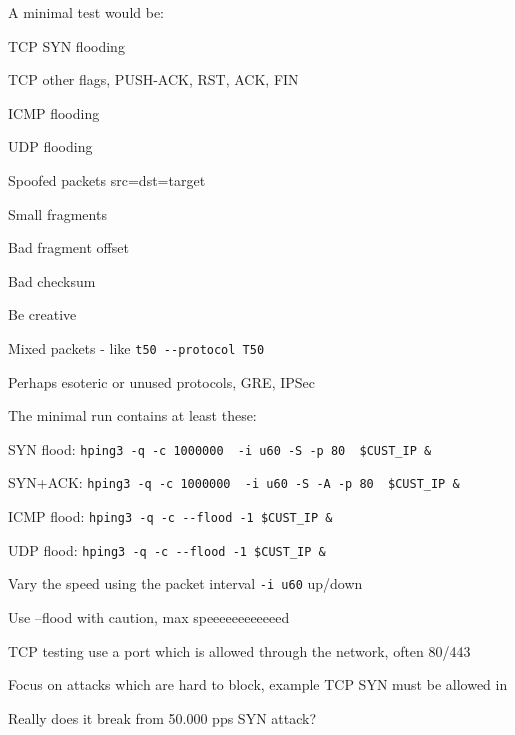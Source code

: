\documentclass[20pt,landscape,a4paper,footrule]{foils}
\begin{document}
A minimal test would be:
\begin{list2}
\item TCP SYN flooding
\item TCP other flags, PUSH-ACK, RST, ACK, FIN
\item ICMP flooding
\item UDP flooding
\item Spoofed packets src=dst=target \smiley
\item Small fragments
\item Bad fragment offset
\item Bad checksum
\item Be creative
\item Mixed packets - like \verb+t50 --protocol T50+
\item Perhaps esoteric or unused protocols, GRE, IPSec
\end{list2}


\begin{list1}
\item The minimal run contains at least these:
\begin{list2}
\item SYN flood: \verb+hping3 -q -c 1000000  -i u60 -S -p 80  $CUST_IP &+
\item SYN+ACK: \verb+hping3 -q -c 1000000  -i u60 -S -A -p 80  $CUST_IP &+
\item ICMP flood: \verb+hping3 -q -c --flood -1 $CUST_IP &+
\item UDP flood: \verb+hping3 -q -c --flood -1 $CUST_IP &+
\end{list2}
\item Vary the speed using the packet interval \verb+-i u60+ up/down
\item Use --flood with caution, max speeeeeeeeeeeed \smiley
\item TCP testing use a port which is allowed through the network, often 80/443
\item Focus on attacks which are hard to block, example TCP SYN must be allowed in
\end{list1}



\centerline{Really does it break from 50.000 pps SYN attack?}


\end{document}
